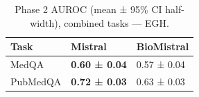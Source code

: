 \begin{table}
\caption{Phase 2 AUROC (mean ± 95\% CI half-width), combined tasks — EGH.}
\label{tab:phase2_auroc_all_egh_probe_oof}
\begin{tabular}{lll}
\toprule
Task & Mistral & BioMistral \\
\midrule
MedQA & \textbf{0.60 ± 0.04} & 0.57 ± 0.04 \\
PubMedQA & \textbf{0.72 ± 0.03} & 0.63 ± 0.03 \\
\bottomrule
\end{tabular}
\end{table}

